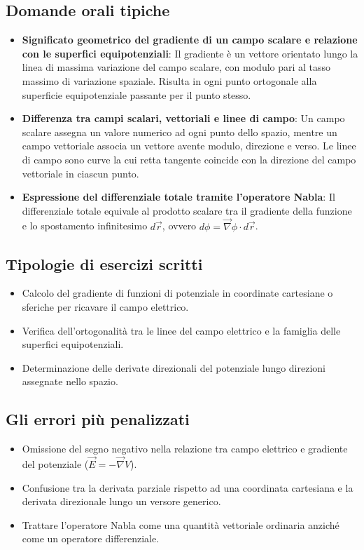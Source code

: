 \documentclass[12pt, a4paper]{article}
\begin{document}
	\subsection{Domande orali tipiche}
	\begin{itemize}
		\item \textbf{Significato geometrico del gradiente di un campo scalare e relazione con le superfici equipotenziali}: Il gradiente è un vettore orientato lungo la linea di massima variazione del campo scalare, con modulo pari al tasso massimo di variazione spaziale. Risulta in ogni punto ortogonale alla superficie equipotenziale passante per il punto stesso.
		\item \textbf{Differenza tra campi scalari, vettoriali e linee di campo}: Un campo scalare assegna un valore numerico ad ogni punto dello spazio, mentre un campo vettoriale associa un vettore avente modulo, direzione e verso. Le linee di campo sono curve la cui retta tangente coincide con la direzione del campo vettoriale in ciascun punto.
		\item \textbf{Espressione del differenziale totale tramite l'operatore Nabla}: Il differenziale totale equivale al prodotto scalare tra il gradiente della funzione e lo spostamento infinitesimo $d\vec{r}$, ovvero $d\phi = \vec{\nabla}\phi \cdot d\vec{r}$.
	\end{itemize}
	
	\subsection{Tipologie di esercizi scritti}
	\begin{itemize}
		\item Calcolo del gradiente di funzioni di potenziale in coordinate cartesiane o sferiche per ricavare il campo elettrico.
		\item Verifica dell'ortogonalità tra le linee del campo elettrico e la famiglia delle superfici equipotenziali.
		\item Determinazione delle derivate direzionali del potenziale lungo direzioni assegnate nello spazio.
	\end{itemize}
	
	\subsection{Gli errori più penalizzati}
	\begin{itemize}
		\item Omissione del segno negativo nella relazione tra campo elettrico e gradiente del potenziale ($\vec{E} = -\vec{\nabla}V$).
		\item Confusione tra la derivata parziale rispetto ad una coordinata cartesiana e la derivata direzionale lungo un versore generico.
		\item Trattare l'operatore Nabla come una quantità vettoriale ordinaria anziché come un operatore differenziale.
	\end{itemize}
	
\end{document}
